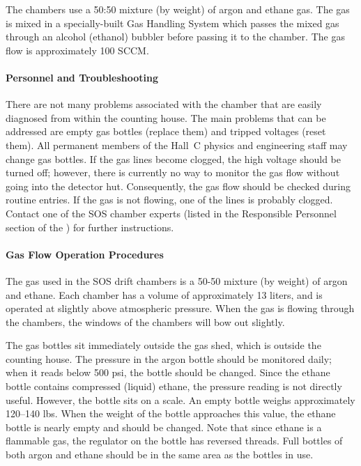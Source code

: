 \begin{obsolete}
The chambers use a 50:50 mixture (by weight) of
argon and ethane gas.  The gas is mixed in a specially-built Gas
Handling System which passes the mixed gas through an alcohol (ethanol) bubbler before
passing it to the chamber.
The gas flow is approximately 100 SCCM.

\paragraph{Personnel and Troubleshooting}

There are not many problems associated with the chamber that are
easily diagnosed from within the counting house.  The main problems
that can be addressed are empty gas bottles (replace them) and tripped
voltages (reset them). All permanent members
of the Hall~C physics and engineering staff may change gas bottles.
If the gas lines become clogged, the high
voltage should be turned off; however, there is currently no way to
monitor the gas flow without going into the detector hut.
Consequently, the gas flow should be checked during routine entries.
If the gas is not flowing, one of the lines is probably clogged.
Contact one of the SOS chamber experts (listed in the Responsible Personnel
section of the 
)
 for further instructions.

\paragraph{Gas Flow Operation Procedures}

The gas used in the SOS drift chambers is a 50-50 mixture (by weight)
of argon and ethane.  Each chamber has a volume of approximately 13
liters, and is operated at slightly above atmospheric pressure.  When
the gas is flowing through the chambers, the windows of the chambers
will bow out slightly.

The gas bottles sit immediately outside the gas shed, which is outside
the counting house.  The pressure in the argon bottle should be
monitored daily; when it reads below 500 psi, the bottle should be
changed.  Since the ethane bottle contains compressed (liquid) ethane,
the pressure reading is not directly useful.  However, the bottle sits
on a scale.  An empty bottle weighs approximately 120--140 lbs.  When
the weight of the bottle approaches this value, the ethane bottle is
nearly empty and should be changed.  Note that since ethane is a
flammable gas, the regulator on the bottle has reversed threads.  Full
bottles of both argon and ethane should be in the same area as the
bottles in use.  


\end{obsolete}
